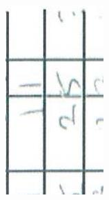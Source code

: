 \documentclass[10pt]{article}
\begin{document}
\includegraphics[max width=\textwidth, center]{2025_02_27_dd68c3d38de88f0516d9g-019(10)}\\
\end{document}
